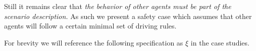 Still it remains clear that {\it the behavior of other agents must be part of the scenario description.} As such we present a safety case which assumes that other agents will follow a certain minimal set of driving rules.

For brevity we will reference the following specification as $\xi$ in the case studies.%